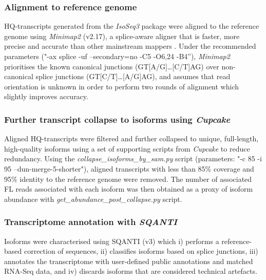 \begin{figure}[htp]
	\label{fig:isoseq3_tool}
\end{figure}

\newpage
\subsubsection{Alignment to reference genome} 
HQ-transcripts generated from the \textit{IsoSeq3} package were aligned to the reference genome using \textit{Minimap2}\cite{Li2018} (v2.17), a splice-aware aligner that is faster, more precise and accurate than other mainstream mappers \cite{SimirKriZanoviC2018,Tang2020}. Under the recommended parameters ("-ax splice -uf --secondary=no -C5 -O6,24 -B4”), \textit{Minimap2} prioritises the known canonical junctions (GT[A/G]…[C/T]AG) over non-canonical splice junctions (GT[C/T]…[A/G]AG), and assumes that read orientation is unknown in order to perform two rounds of alignment which slightly improves accuracy. 

\subsubsection{Further transcript collapse to isoforms using \textit{Cupcake}}
Aligned HQ-transcripts were filtered and further collapsed to unique, full-length, high-quality isoforms using a set of supporting scripts from \textit{Cupcake} to reduce redundancy. Using the \textit{collapse\_isoforms\_by\_sam.py} script (parameters: "-c 85 -i 95 --dun-merge-5-shorter"), aligned transcripts with less than 85\% coverage and 95\% identity to the reference genome were removed. The number of associated FL reads associated with each isoform was then obtained as a proxy of isoform abundance with \textit{get\_abundance\_post\_collapse.py} script. 

\subsubsection{Transcriptome annotation with \textit{SQANTI}}
\label{section: sqanti_annotations}
Isoforms were characterised using SQANTI\cite{Tardaguila2018} (v3) which i) performs a reference-based correction of sequences, ii) classifies isoforms based on splice junctions, iii) annotates the transcriptome with user-defined public annotations and matched RNA-Seq data, and iv) discards isoforms that are considered technical artefacts. 

